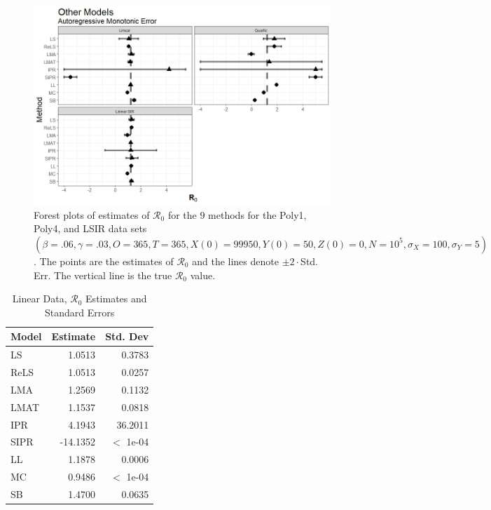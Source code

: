 \documentclass[12pt]{article}
\newcommand{\xxsir}{\ensuremath{9} } %
\newcommand{\rr}{\ensuremath{\mathcal{R}_0}}
\begin{document}
\begin{figure}[H]
	\begin{center}
		\includegraphics[scale=0.5]{images/other_arm.jpeg}
		\caption{Forest plots of estimates of $\rr$ for the \xxsir methods for the Poly1, Poly4, and LSIR data sets $(\beta=.06, \gamma=.03, O=365, T=365, X(0)=99950, Y(0)=50, Z(0)=0, N=10^5, \sigma_X=100, \sigma_Y=5)$.  The points are the estimates of $\rr$ and the lines denote $\pm 2\cdot $Std. Err.  The vertical line is the true $\rr$ value.}
	\end{center}
\end{figure}

\begin{table}[H]
	
	\centering
	\begin{tabular}[t]{l|r|r}
		\hline
		Model & Estimate & Std. Dev\\
		\hline
		LS & 1.0513 & 0.3783\\
		\hline
		ReLS & 1.0513 & 0.0257\\
		\hline
		LMA & 1.2569 & 0.1132\\
		\hline
		LMAT & 1.1537 & 0.0818\\
		\hline
		IPR & 4.1943 & 36.2011\\
		\hline
		SIPR & -14.1352 & $<$ 1e-04\\
		\hline
		LL & 1.1878 & 0.0006\\
		\hline
		MC & 0.9486 & $<$ 1e-04\\
		\hline
		SB & 1.4700 & 0.0635\\
		\hline
	\end{tabular}
	\caption{Linear Data, $\rr$ Estimates and Standard Errors}
\end{table}
\end{document}
